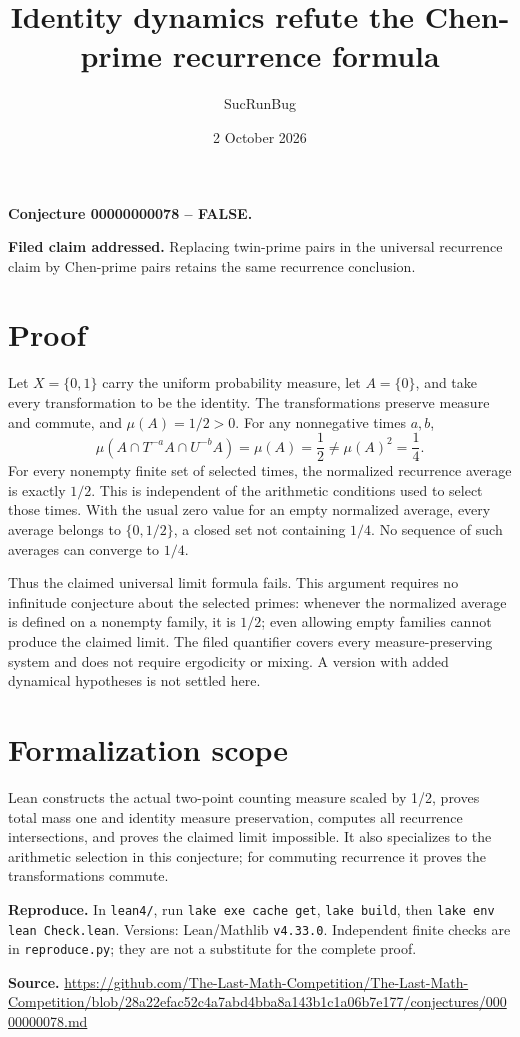 \documentclass[11pt]{article}
\title{Identity dynamics refute the Chen-prime recurrence formula}
\author{SucRunBug}
\date{2 October 2026}
\begin{document}
\maketitle
\textbf{Conjecture 00000000078 -- FALSE.}

\textbf{Filed claim addressed.} Replacing twin-prime pairs in the universal recurrence claim by Chen-prime pairs retains the same recurrence conclusion.

\section*{Proof}
Let $X=\{0,1\}$ carry the uniform probability measure, let $A=\{0\}$, and take every transformation to be the identity. The transformations preserve measure and commute, and $\mu(A)=1/2>0$. For any nonnegative times $a,b$,
\[\mu(A\cap T^{-a}A\cap U^{-b}A)=\mu(A)=\frac12\ne\mu(A)^2=\frac14.\]
For every nonempty finite set of selected times, the normalized recurrence average is exactly $1/2$. This is independent of the arithmetic conditions used to select those times. With the usual zero value for an empty normalized average, every average belongs to $\{0,1/2\}$, a closed set not containing $1/4$. No sequence of such averages can converge to $1/4$.

Thus the claimed universal limit formula fails. This argument requires no infinitude conjecture about the selected primes: whenever the normalized average is defined on a nonempty family, it is $1/2$; even allowing empty families cannot produce the claimed limit. The filed quantifier covers every measure-preserving system and does not require ergodicity or mixing. A version with added dynamical hypotheses is not settled here.

\section*{Formalization scope}
Lean constructs the actual two-point counting measure scaled by 1/2, proves total mass one and identity measure preservation, computes all recurrence intersections, and proves the claimed limit impossible. It also specializes to the arithmetic selection in this conjecture; for commuting recurrence it proves the transformations commute.

\textbf{Reproduce.} In \texttt{lean4/}, run \texttt{lake exe cache get},
\texttt{lake build}, then \texttt{lake env lean Check.lean}. Versions:
Lean/Mathlib \texttt{v4.33.0}. Independent finite checks are in
\texttt{reproduce.py}; they are not a substitute for the complete proof.

\textbf{Source.} \url{https://github.com/The-Last-Math-Competition/The-Last-Math-Competition/blob/28a22efac52c4a7abd4bba8a143b1c1a06b7e177/conjectures/00000000078.md}
\end{document}
